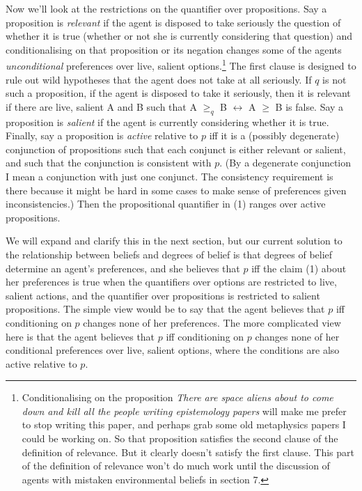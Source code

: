 Now we'll look at the restrictions on the quantifier over propositions. Say a proposition is \textit{relevant} if the agent is disposed to take seriously the question of whether it is true (whether or not she is currently considering that question) and conditionalising on that proposition or its negation changes some of the agents \textit{unconditional} preferences over live, salient options.\footnote{Conditionalising on the proposition \textit{There are space aliens about to come down and kill all the people writing epistemology papers} will make me prefer to stop writing this paper, and perhaps grab some old metaphysics papers I could be working on. So that proposition satisfies the second clause of the definition of relevance. But it clearly doesn't satisfy the first clause. This part of the definition of relevance won't do much work until the discussion of agents with mistaken environmental beliefs in section 7.} The first clause is designed to rule out wild hypotheses that the agent does not take at all seriously. If \(q\) is not such a proposition, if the agent is disposed to take it seriously, then it is relevant if there are live, salient A and B such that A \(\geq _q\) B \(\leftrightarrow\) A \(\geq\) B is false. Say a proposition is \textit{salient} if the agent is currently considering whether it is true. Finally, say a proposition is \textit{active} relative to \(p\) iff it is a (possibly degenerate) conjunction of propositions such that each conjunct is either relevant or salient, and such that the conjunction is consistent with \(p\). (By a degenerate conjunction I mean a conjunction with just one conjunct. The consistency requirement is there because it might be hard in some cases to make sense of preferences given inconsistencies.) Then the propositional quantifier in (1) ranges over active propositions.

We will expand and clarify this in the next section, but our current solution to the relationship between beliefs and degrees of belief is that degrees of belief determine an agent's preferences, and she believes that \(p\) iff the claim (1) about her preferences is true when the quantifiers over options are restricted to live, salient actions, and the quantifier over propositions is restricted to salient propositions. The simple view would be to say that the agent believes that \(p\) iff conditioning on \(p\) changes none of her preferences. The more complicated view here is that the agent believes that \(p\) iff conditioning on \(p\) changes none of her conditional preferences over live, salient options, where the conditions are also active relative to \(p\).



